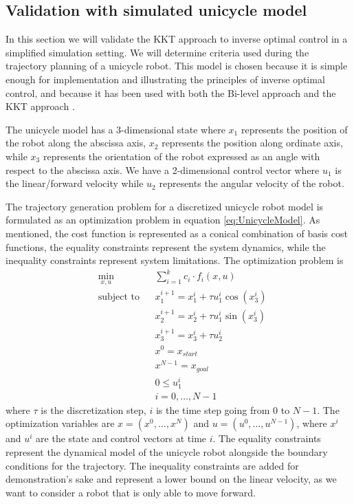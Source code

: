 \documentclass[12pt, a4paper]{article}
\begin{document}
\subsection{Validation with simulated unicycle model}
In this section we will validate the KKT approach to inverse optimal control in a simplified simulation setting. We will determine criteria used during the trajectory planning of a unicycle robot. This model is chosen because it is simple enough for implementation and illustrating the principles of inverse optimal control, and because it has been used with both the Bi-level approach \cite{mombaur2010human} and the KKT approach \cite{puydupin2012convex}.\par
The unicycle model has a 3-dimensional state where \( x_1\) represents the position of the robot along the abscissa axis, \( x_2\) represents the position along ordinate axis, while \( x_3\) represents the orientation of the robot expressed as an angle with respect to the abscissa axis. We have a 2-dimensional control vector where \( u_1\) is the linear/forward velocity while \( u_2\) represents the angular velocity of the robot.\par
The trajectory generation problem for a discretized unicycle robot model is formulated as an optimization problem in equation \eqref{eq:UnicycleModel}. As mentioned, the cost function is represented as a conical combination of basis cost functions, the equality constraints represent the system dynamics, while the inequality constraints represent system limitations. The optimization problem is
\begin{equation} \label{eq:UnicycleModel}
    \begin{aligned}
    &\min_{x, u} & & \sum_{i=1}^k c_i \cdot f_i(x, u) \\
    &\text{subject to} & & x_1^{i+1} = x_1^i + \tau u_1^i \cos(x_3^i) \\
    &                  & & x_2^{i+1} = x_2^i + \tau u_1^i \sin(x_3^i) \\
    &                  & & x_3^{i+1} = x_3^i + \tau u_2^i             \\
    &                  & & x^0 = x_{start} \\
    &                  & & x^{N-1} = x_{goal} \\
    &                  & & 0 \leq u_1^i \\
    &                  & & i = 0, \ldots, N-1
    \end{aligned}
\end{equation}
where \( \tau \) is the discretization step, \(  i\) is the time step going from \( 0\) to \( N-1\). The optimization variables are \( x = (x^0, \ldots, x^N)\) and \( u = (u^0,\ldots,u^{N-1})\), where $x^i$ and $u^i$ are the state and control vectors at time $i$. The equality constraints represent the dynamical model of the unicycle robot alongside the boundary conditions for the trajectory. The inequality constraints are added for demonstration's sake and represent a lower bound on the linear velocity, as we want to consider a robot that is only able to move forward.\par
\end{document}
